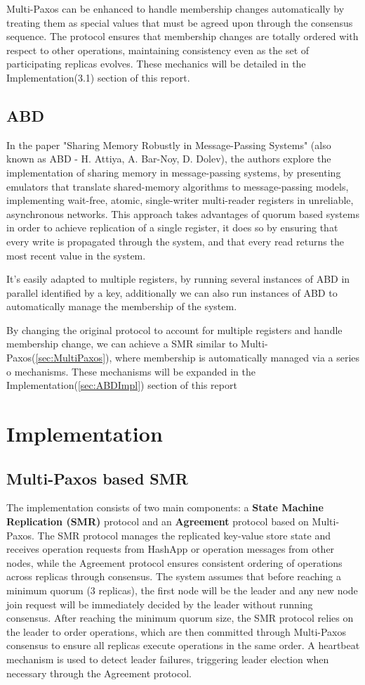 \documentclass[10pt,a4paper,twocolumn]{article}
\begin{document}
Multi-Paxos can be enhanced to handle membership changes automatically by treating them as special values that must be agreed upon through the consensus sequence. The protocol ensures that membership changes are totally ordered with respect to other operations, maintaining consistency even as the set of participating replicas evolves. These mechanics will be detailed in the Implementation(3.1) section of this report.


\subsection{ABD}
\label{sec:ABD}
In the paper "Sharing Memory Robustly in Message-Passing Systems"\cite{abd} (also known as ABD - H. Attiya, A. Bar-Noy, D. Dolev), the authors explore the implementation of sharing memory in message-passing systems, by presenting emulators that translate shared-memory algorithms to message-passing models, implementing wait-free, atomic, single-writer multi-reader registers in unreliable, asynchronous networks. This approach takes advantages of quorum based systems in order to achieve replication of a single register, it does so by ensuring that every write is propagated through the system, and that every read returns the most recent value in the system.
\par It's easily adapted to multiple registers, by running several instances of ABD in parallel identified by a key, additionally we can also run instances of ABD to automatically manage the membership of the system.
\par By changing the original protocol to account for multiple registers and handle membership change, we can achieve a SMR similar to Multi-Paxos(\ref{sec:MultiPaxos}), where membership is automatically managed via a series o mechanisms. These mechanisms will be expanded in the Implementation(\ref{sec:ABDImpl}) section of this report

\section{Implementation}
\subsection{Multi-Paxos based SMR}
The implementation consists of two main components: a \textbf{State Machine Replication (SMR)} protocol and an \textbf{Agreement} protocol based on Multi-Paxos.
The SMR protocol manages the replicated key-value store state and receives operation requests from HashApp or operation messages from other nodes, while the Agreement protocol ensures consistent ordering of operations across replicas through consensus.
The system assumes that before reaching a minimum quorum (3 replicas), the first node will be the leader and any new node join request will be immediately decided by the leader without running consensus. After reaching the minimum quorum size, the SMR protocol relies on the leader to order operations, which are then committed through Multi-Paxos consensus to ensure all replicas execute operations in the same order.
A heartbeat mechanism is used to detect leader failures, triggering leader election when necessary through the Agreement protocol.
\end{document}
